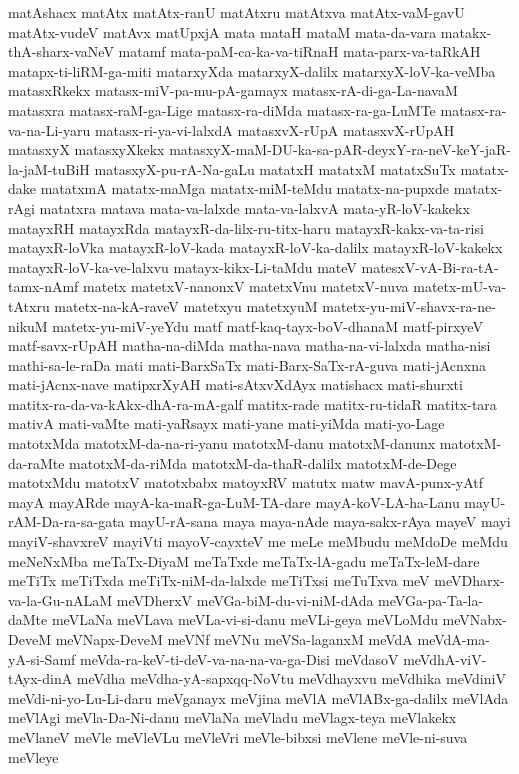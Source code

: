 {matAshacx
matAtx
matAtx-ranU
matAtxru
matAtxva
matAtx-vaM-gavU
matAtx-vudeV
matAvx
matUpxjA
mata
mataH
mataM
mata-da-vara
matakx-thA-sharx-vaNeV
matamf
mata-paM-ca-ka-va-tiRnaH
mata-parx-va-taRkAH
matapx-ti-liRM-ga-miti
matarxyXda
matarxyX-dalilx
matarxyX-loV-ka-veMba
matasxRkekx
matasx-miV-pa-mu-pA-gamayx
matasx-rA-di-ga-La-navaM
matasxra
matasx-raM-ga-Lige
matasx-ra-diMda
matasx-ra-ga-LuMTe
matasx-ra-va-na-Li-yaru
matasx-ri-ya-vi-lalxdA
matasxvX-rUpA
matasxvX-rUpAH
matasxyX
matasxyXkekx
matasxyX-maM-DU-ka-sa-pAR-deyxY-ra-neV-keY-jaR-la-jaM-tuBiH
matasxyX-pu-rA-Na-gaLu
matatxH
matatxM
matatxSuTx
matatx-dake
matatxmA
matatx-maMga
matatx-miM-teMdu
matatx-na-pupxde
matatx-rAgi
matatxra
matava
mata-va-lalxde
mata-va-lalxvA
mata-yR-loV-kakekx
matayxRH
matayxRda
matayxR-da-lilx-ru-titx-haru
matayxR-kakx-va-ta-risi
matayxR-loVka
matayxR-loV-kada
matayxR-loV-ka-dalilx
matayxR-loV-kakekx
matayxR-loV-ka-ve-lalxvu
matayx-kikx-Li-taMdu
mateV
matesxV-vA-Bi-ra-tA-tamx-nAmf
matetx
matetxV-nanonxV
matetxVnu
matetxV-nuva
matetx-mU-va-tAtxru
matetx-na-kA-raveV
matetxyu
matetxyuM
matetx-yu-miV-shavx-ra-ne-nikuM
matetx-yu-miV-yeYdu
matf
matf-kaq-tayx-boV-dhanaM
matf-pirxyeV
matf-savx-rUpAH
matha-na-diMda
matha-nava
matha-na-vi-lalxda
matha-nisi
mathi-sa-le-raDa
mati
mati-BarxSaTx
mati-Barx-SaTx-rA-guva
mati-jAcnxna
mati-jAcnx-nave
matipxrXyAH
mati-sAtxvXdAyx
matishacx
mati-shurxti
matitx-ra-da-va-kAkx-dhA-ra-mA-galf
matitx-rade
matitx-ru-tidaR
matitx-tara
mativA
mati-vaMte
mati-yaRsayx
mati-yane
mati-yiMda
mati-yo-Lage
matotxMda
matotxM-da-na-ri-yanu
matotxM-danu
matotxM-danunx
matotxM-da-raMte
matotxM-da-riMda
matotxM-da-thaR-dalilx
matotxM-de-Dege
matotxMdu
matotxV
matotxbabx
matoyxRV
matutx
matw
mavA-punx-yAtf
mayA
mayARde
mayA-ka-maR-ga-LuM-TA-dare
mayA-koV-LA-ha-Lanu
mayU-rAM-Da-ra-sa-gata
mayU-rA-sana
maya
maya-nAde
maya-sakx-rAya
mayeV
mayi
mayiV-shavxreV
mayiVti
mayoV-cayxteV
me
meLe
meMbudu
meMdoDe
meMdu
meNeNxMba
meTaTx-DiyaM
meTaTxde
meTaTx-lA-gadu
meTaTx-leM-dare
meTiTx
meTiTxda
meTiTx-niM-da-lalxde
meTiTxsi
meTuTxva
meV
meVDharx-va-la-Gu-nALaM
meVDherxV
meVGa-biM-du-vi-niM-dAda
meVGa-pa-Ta-la-daMte
meVLaNa
meVLava
meVLa-vi-si-danu
meVLi-geya
meVLoMdu
meVNabx-DeveM
meVNapx-DeveM
meVNf
meVNu
meVSa-laganxM
meVdA
meVdA-ma-yA-si-Samf
meVda-ra-keV-ti-deV-va-na-na-va-ga-Disi
meVdasoV
meVdhA-viV-tAyx-dinA
meVdha
meVdha-yA-sapxqq-NoVtu
meVdhayxvu
meVdhika
meVdiniV
meVdi-ni-yo-Lu-Li-daru
meVganayx
meVjina
meVlA
meVlABx-ga-dalilx
meVlAda
meVlAgi
meVla-Da-Ni-danu
meVlaNa
meVladu
meVlagx-teya
meVlakekx
meVlaneV
meVle
meVleVLu
meVleVri
meVle-bibxsi
meVlene
meVle-ni-suva
meVleye
}
